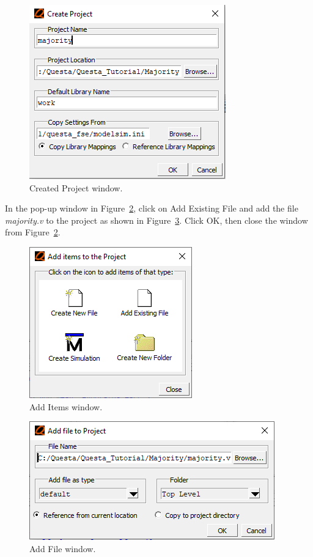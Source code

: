 \documentclass[11pt, twoside, pdftex]{article}
\begin{document}
\begin{figure}[H]
   \begin{center}
      \includegraphics[scale=1.0]{figures/figure2.png}
   \caption{Created Project window.} 
	 \label{fig:2}
	 \end{center}
\end{figure}
\newpage
In the pop-up window in Figure~\ref{fig:3}, click on {\sf Add Existing File} and add the 
file {\it majority.v} to the project as shown in Figure~\ref{fig:4}. Click OK, then close the 
window from Figure~\ref{fig:3}.

\begin{figure}[H]
   \begin{center}
      \includegraphics[scale=0.85]{figures/figure3.png}
   \caption{Add Items window.} 
	 \label{fig:3}
	 \end{center}
\end{figure}

\begin{figure}[H]
   \begin{center}
      \includegraphics[scale=0.75]{figures/add_file.png}
   \caption{Add File window.} 
	 \label{fig:4}
	 \end{center}
\end{figure}
\end{document}
